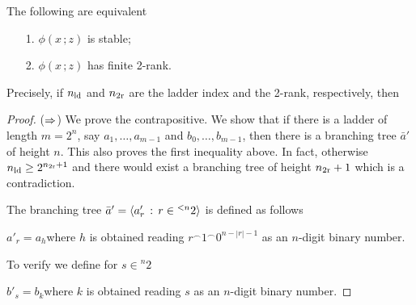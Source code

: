 \documentclass[scombinatorics.tex]{subfiles}
\begin{document}
\begin{theorem}
  The following are equivalent
  \begin{itemize}
    \item[1.] $\phi(x\,;z)$ is stable;
    \item[2.] $\phi(x\,;z)$ has finite 2-rank.
  \end{itemize}
  Precisely, if $n_{\rm ld}$ and $n_{\rm 2r}$ are the ladder index and the 2-rank, respectively, then 
  

\end{theorem}

\begin{proof}





  ($\Rightarrow$) 
  We prove the contrapositive.
  We show that if there is a ladder of length $m=2^n$, say $a_1,\dots,a_{m-1}$ and $b_0,\dots,b_{m-1}$, then there is a branching tree $\bar a'$ of height $n$.
  This also proves the first inequality above.
  In fact, otherwise $n_{\rm ld}\ge 2^{n_{\rm 2r}+1}$ and there would exist a branching tree of height $n_{\rm 2r}+1$ which is a contradiction.
  
  The branching tree $\bar a'=\langle a'_r\, :\, r\in{}^{<n}2\rangle$ is defined as follows

  \quad $a'_r=a_h$\quad  where $h$ is obtained reading $r^\frown1^\frown0^{n-|r|-1}$ as an $n$-digit binary number.

  To verify  we define for $s\in{}^n2$ 
  
  \quad $b'_s=b_k$\quad  where $k$ is obtained reading $s$ as an $n$-digit binary number.


\end{proof}
\end{document}
